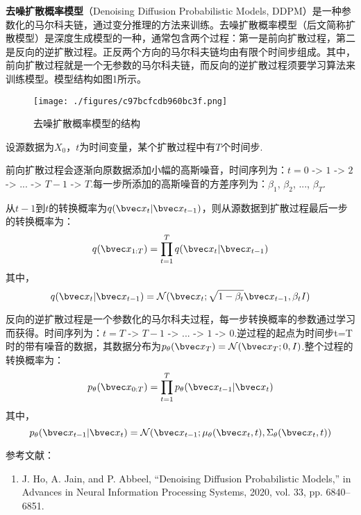 
\textbf{去噪扩散概率模型}（Denoising Diffusion Probabilistic Models, DDPM）是一种参数化的马尔科夫链，通过变分推理的方法来训练。去噪扩散概率模型（后文简称扩散模型）是深度生成模型的一种，通常包含两个过程：第一是前向扩散过程，第二是反向的逆扩散过程。正反两个方向的马尔科夫链均由有限个时间步组成。其中，前向扩散过程就是一个无参数的马尔科夫链，而反向的逆扩散过程须要学习算法来训练模型。模型结构如图1所示。
\begin{figure}[ht]
\centering
\texttt{[image: ./figures/c97bcfcdb960bc3f.png]}
\caption{去噪扩散概率模型的结构} \label{fig_DDPM_1}
\end{figure}

设源数据为$X_0$，$t$为时间变量，某个扩散过程中有$T$个时间步.

前向扩散过程会逐渐向原数据添加小幅的高斯噪音，时间序列为：$t=0$ -> $1$ -> $2$ -> ... -> $T-1$ -> $T$.每一步所添加的高斯噪音的方差序列为：$\beta_1$, $\beta_2$, ..., $\beta_T$.

从$t-1$到$t$的转换概率为$q(\bvec x_t|\bvec x_{t-1})$，则从源数据到扩散过程最后一步的转换概率为：
\begin{equation}
q(\bvec x_{1:T})=\prod_{t=1}^{T}q(\bvec x_{t}|\bvec x_{t-1})
\end{equation}
其中，
\begin{equation}
q(\bvec x_{t}|\bvec x_{t-1})=\mathcal{N}(\bvec x_t;\sqrt{1-\beta_t}\bvec x_{t-1},\beta_tI)
\end{equation}

反向的逆扩散过程是一个参数化的马尔科夫过程，每一步转换概率的参数通过学习而获得。时间序列为：$t=T$ -> $T-1$ -> ... -> $1$ -> $0$.逆过程的起点为时间步t=T时的带有噪音的数据，其数据分布为$p_\theta(\bvec x_T)=\mathcal{N}(\bvec x_T;0,I)$.整个过程的转换概率为：
\begin{equation}
p_{\theta}(\bvec x_{0:T})=\prod_{t=1}^{T}p_{\theta}(\bvec x_{t-1}|\bvec x_{t})
\end{equation}
其中，
\begin{equation}
p_{\theta}(\bvec x_{t-1}|\bvec x_{t})=\mathcal{N}(\bvec x_{t-1};\mu_\theta(\bvec x_{t},t),\Sigma_\theta(\bvec x_t,t))
\end{equation}


参考文献：
\begin{enumerate}
\item J. Ho, A. Jain, and P. Abbeel, “Denoising Diffusion Probabilistic Models,” in Advances in Neural Information Processing Systems, 2020, vol. 33, pp. 6840–6851.
\end{enumerate}